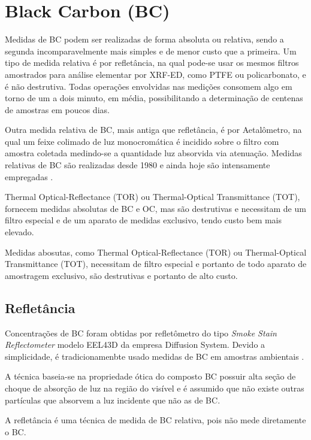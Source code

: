 \section{Black Carbon (BC)}

Medidas de BC podem ser realizadas de forma absoluta ou relativa, sendo a
segunda incomparavelmente mais simples e de menor custo que a primeira. 
Um tipo de medida relativa é por refletância, na qual pode-se usar os mesmos 
filtros amostrados para análise elementar por XRF-ED, como PTFE ou 
policarbonato, e é não destrutiva. Todas operações envolvidas nas medições 
consomem algo em torno de um a dois minuto, em média, possibilitando a 
determinação de centenas de amostras em poucos dias.

Outra medida relativa de BC, mais antiga que refletância, é por Aetalômetro,
na qual um feixe colimado de luz monocromática é incidido sobre o
filtro com amostra coletada medindo-se a quantidade luz absorvida via 
atenuação. Medidas relativas de BC são realizadas desde 1980 e ainda hoje são 
intensamente empregadas \citep{targino2016}.

Thermal Optical-Reflectance (TOR) ou Thermal-Optical Transmittance (TOT), 
fornecem medidas absolutas de BC e OC, mas são destrutivas e necessitam de um filtro especial e de um aparato de medidas exclusivo, tendo custo bem mais elevado.

Medidas abosutas, como Thermal Optical-Reflectance (TOR) ou 
Thermal-Optical Transmittance (TOT), necessitam de filtro especial e portanto de 
todo aparato de amostragem exclusivo, são destrutivas e portanto de alto custo.

\subsection{Refletância}

Concentrações de BC foram obtidas por refletômetro do tipo 
\textit{Smoke Stain Reflectometer} modelo EEL43D da empresa Diffusion System.
Devido a simplicidade, é tradicionamenbte usado medidas de BC em 
amostras ambientais \citep{lack2014}. 

A técnica baseia-se na propriedade ótica do composto BC possuir alta seção 
de choque 
de absorção de luz na região do visível e é assumido que não existe outras 
partículas que absorvem a luz incidente que não as de BC.

A refletância é uma técnica de medida de BC relativa, pois não mede diretamente
o BC. 

